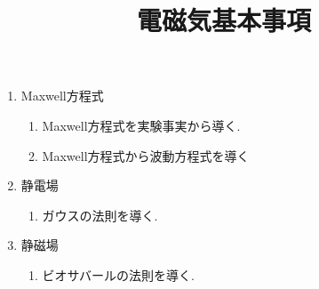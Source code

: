 \documentclass[11pt,a4paper]{jarticle}
\title{電磁気基本事項}
\author{}
\date{}
\begin{document}
\maketitle
\begin{enumerate}
    \item Maxwell方程式
    \begin{enumerate}
        \item Maxwell方程式を実験事実から導く.
        \item Maxwell方程式から波動方程式を導く
    \end{enumerate}
    \item 静電場
    \begin{enumerate}
        \item ガウスの法則を導く.
    \end{enumerate}
    \item 静磁場
    \begin{enumerate}
        \item ビオサバールの法則を導く.
    \end{enumerate}
\end{enumerate}
\end{document}

